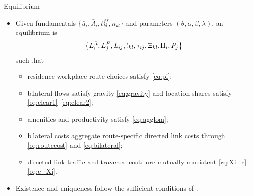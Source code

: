 \documentclass[11pt,aspectratio=169]{beamer}
\newcommand{\app}[1]{\allowbreak\hspace{0.25em}\hyperlink{#1}{\beamergotobutton{details}}}
\begin{document}
\begin{frame}[label=equilibrium]{Equilibrium}
\begin{itemize}\footnotesize
  \item Given fundamentals $\{\bar u_i,\bar A_i,t_{kl}^{ff},n_{kl}\}$ and parameters $(\theta,\alpha,\beta,\lambda)$, an equilibrium is
  \vspace{-0.45em}\begin{equation}
    \left\{L_i^R,L_j^F,L_{ij},t_{kl},\tau_{ij},\Xi_{kl},\Pi_i,P_j\right\}
  \vspace{-0.55em}\end{equation}
  such that
  \begin{itemize}\scriptsize
    \item residence-workplace-route choices satisfy \eqref{eq:pi};
    \item bilateral flows satisfy gravity \eqref{eq:gravity} and location shares satisfy \eqref{eq:clear1}--\eqref{eq:clear2};
    \item amenities and productivity satisfy \eqref{eq:agglom};
    \item bilateral costs aggregate route-specific directed link costs through \eqref{eq:routecost} and \eqref{eq:bilateral};
    \item directed link traffic and traversal costs are mutually consistent \eqref{eq:Xi_c}--\eqref{eq:c_Xi}.
  \end{itemize}
  \item Existence and uniqueness follow the sufficient conditions of \citet[Proposition~1]{allenarkolakis2022}. \app{appexist}
\end{itemize}
\end{frame}

\end{document}
